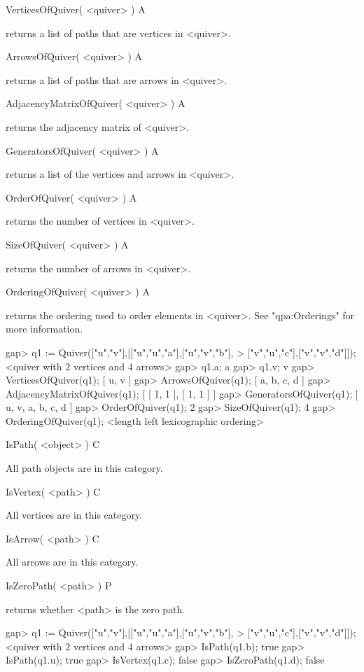 \>VerticesOfQuiver( <quiver> ) A

returns a list of paths that are vertices in <quiver>.

\>ArrowsOfQuiver( <quiver> ) A

returns a list of paths that are arrows in <quiver>.

\>AdjacencyMatrixOfQuiver( <quiver> ) A

returns the adjacency matrix of <quiver>.

\>GeneratorsOfQuiver( <quiver> ) A

returns a list of the vertices and arrows in <quiver>.

\>OrderOfQuiver( <quiver> ) A

returns the number of vertices in <quiver>.

\>SizeOfQuiver( <quiver> ) A

returns the number of arrows in <quiver>.

\>OrderingOfQuiver( <quiver> ) A

returns the ordering used to order elements in <quiver>.
See "qpa:Orderings" for more information.

\beginexample
gap> q1 := Quiver(["u","v"],[["u","u","a"],["u","v","b"],
> ["v","u","c"],["v","v","d"]]);
<quiver with 2 vertices and 4 arrows>
gap> q1.a;
a
gap> q1.v;
v
gap> VerticesOfQuiver(q1);
[ u, v ]
gap> ArrowsOfQuiver(q1);
[ a, b, c, d ]
gap> AdjacencyMatrixOfQuiver(q1);
[ [ 1, 1 ], [ 1, 1 ] ]
gap> GeneratorsOfQuiver(q1);
[ u, v, a, b, c, d ]
gap> OrderOfQuiver(q1);
2
gap> SizeOfQuiver(q1);
4
gap> OrderingOfQuiver(q1);
<length left lexicographic ordering>
\endexample


\>IsPath( <object> ) C

All path objects are in this category.

\>IsVertex( <path> ) C

All vertices are in this category.

\>IsArrow( <path> ) C

All arrows are in this category.

\>IsZeroPath( <path> ) P

returns whether <path> is the zero path.

\beginexample
gap> q1 := Quiver(["u","v"],[["u","u","a"],["u","v","b"],
> ["v","u","c"],["v","v","d"]]);
<quiver with 2 vertices and 4 arrows>
gap> IsPath(q1.b);
true
gap> IsPath(q1.u);
true
gap> IsVertex(q1.c);
false
gap> IsZeroPath(q1.d);
false
\endexample

